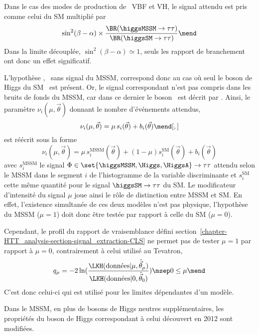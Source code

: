 Dans le cas des modes de production de \higgsMSSM\ VBF et VH,
le signal attendu est pris comme celui du SM multiplié par
\begin{equation}
\sin^2(\beta-\alpha) \times \frac{\BR(\higgsMSSM\to\tau\tau)}{\BR(\higgsSM\to\tau\tau)}
\mend
\end{equation}
Dans la limite découplée, $\sin^2(\beta-\alpha)\simeq1$, seuls les rapport de branchement ont donc un effet significatif.
\par
L'hypothèse \hypB, \ie\ sans signal du MSSM, correspond donc au cas où seul le boson de Higgs du SM \higgsSM\ est présent.
Or, le signal correspondant n'est pas compris dans les bruits de fonds du MSSM, car dans ce dernier le boson \higgs\ est décrit par \higgsMSSM.
Ainsi, le paramètre $\nu_i(\mu,\vec{\theta})$ donnant le nombre d'événements attendus,
\begin{equation}
\nu_i(\mu,\vec{\theta}) = \mu \, s_i(\vec{\theta}) + b_i(\vec{\theta}) \mend[,]
\end{equation}
est réécrit sous la forme
\begin{equation}
\nu_i(\mu,\vec{\theta}) = \mu \, s_i^\text{MSSM}(\vec{\theta}) + (1-\mu)s_i^\text{SM}(\vec{\theta}) + b_i(\vec{\theta})
\end{equation}
avec
$s_i^\text{MSSM}$ le signal $\Phi\in\set{\higgsMSSM,\Higgs,\HiggsA}\to\tau\tau$ attendu selon le MSSM
dans le segment $i$ de l'histogramme de la variable discriminante
et
$s_i^\text{SM}$ cette même quantité pour le signal $\higgsSM\to\tau\tau$ du SM.
Le modificateur d'intensité du signal $\mu$ joue ainsi le rôle de distinction entre MSSM et SM.
En effet, l'existence simultanée de ces deux modèles n'est pas physique,
l'hypothèse du MSSM ($\mu=1$) doit donc être testée par rapport à celle du SM ($\mu=0$).
\par
Cependant, le profil du rapport de vraisemblance défini section~\ref{chapter-HTT_analysis-section-signal_extraction-CLS}
ne permet pas de tester $\mu=1$ par rapport à $\mu=0$,
contrairement à celui utilisé au Tevatron,
\begin{equation}
q_{\mu} = -2 \ln(\frac{\LKH(\text{données} |  \mu, \hat{\vec{\theta}}_{\mu})}{\LKH(\text{données} |  0, \hat{\vec{\theta}}_{0})})
\msep
0 \leq \mu
\mend
\end{equation}
C'est donc celui-ci qui est utilisé pour les limites dépendantes d'un modèle.
\par
Dans le MSSM, en plus de bosons de Higgs neutres supplémentaires, les propriétés du boson de Higgs correspondant à celui découvert en 2012 sont modifiées.
